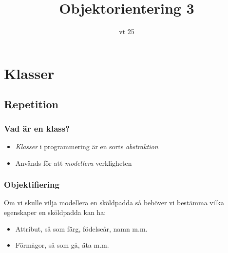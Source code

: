 \documentclass[aspectratio=169]{beamer}
\begin{document}


\title{Objektorientering 3}
\date{vt 25}

\maketitle

\section{Klasser}

\subsection{Repetition}

\begin{frame}
	\frametitle{Vad är en klass?}

	\begin{itemize}
		\item \textit{Klasser} i programmering är en sorts \textit{abstraktion}
		\item Används för att \textit{modellera} verkligheten
	\end{itemize}

\end{frame}

\begin{frame}
	\frametitle{Objektifiering}
	
	Om vi skulle vilja modellera en sköldpadda så behöver vi bestämma vilka egenskaper en sköldpadda kan ha:
	
	\begin{itemize}
		\item Attribut, så som färg, födelseår, namn m.m.
		\item Förmågor, så som gå, äta m.m.
	\end{itemize}

\end{frame}
\end{document}
